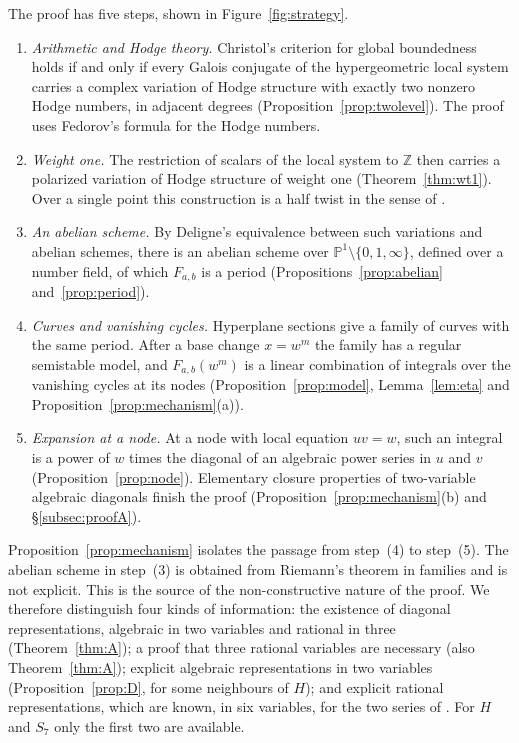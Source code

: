 \documentclass[11pt]{amsart}
\theoremstyle{definition}
\theoremstyle{remark}
\numberwithin{equation}{section}
\newcommand{\Z}{\mathbb{Z}}
\newcommand{\PP}{\mathbb{P}}
\newcommand{\Fab}{F_{a,b}}
\begin{document}
The proof has five steps, shown in Figure~\ref{fig:strategy}.
\begin{enumerate}[label=(\arabic*),leftmargin=2em]
\item \emph{Arithmetic and Hodge theory.} Christol's criterion for global boundedness holds if and only if every Galois conjugate of the hypergeometric local system carries a complex variation of Hodge structure with exactly two nonzero Hodge numbers, in adjacent degrees (Proposition~\ref{prop:twolevel}). The proof uses Fedorov's formula for the Hodge numbers.
\item \emph{Weight one.} The restriction of scalars of the local system to $\Z$ then carries a polarized variation of Hodge structure of weight one (Theorem~\ref{thm:wt1}). Over a single point this construction is a half twist in the sense of \citet{vanGeemen2001}.
\item \emph{An abelian scheme.} By Deligne's equivalence between such variations and abelian schemes, there is an abelian scheme over $\PP^1\setminus\{0,1,\infty\}$, defined over a number field, of which $\Fab$ is a period (Propositions~\ref{prop:abelian} and~\ref{prop:period}).
\item \emph{Curves and vanishing cycles.} Hyperplane sections give a family of curves with the same period. After a base change $x=w^m$ the family has a regular semistable model, and $\Fab(w^m)$ is a linear combination of integrals over the vanishing cycles at its nodes (Proposition~\ref{prop:model}, Lemma~\ref{lem:eta} and Proposition~\ref{prop:mechanism}(a)).
\item \emph{Expansion at a node.} At a node with local equation $uv=w$, such an integral is a power of $w$ times the diagonal of an algebraic power series in $u$ and $v$ (Proposition~\ref{prop:node}). Elementary closure properties of two-variable algebraic diagonals finish the proof (Proposition~\ref{prop:mechanism}(b) and \S\ref{subsec:proofA}).
\end{enumerate}
Proposition~\ref{prop:mechanism} isolates the passage from step~(4) to step~(5). The abelian scheme in step~(3) is obtained from Riemann's theorem in families and is not explicit. This is the source of the non-constructive nature of the proof. We therefore distinguish four kinds of information: the existence of diagonal representations, algebraic in two variables and rational in three (Theorem~\ref{thm:A}); a proof that three rational variables are necessary (also Theorem~\ref{thm:A}); explicit algebraic representations in two variables (Proposition~\ref{prop:D}, for some neighbours of $H$); and explicit rational representations, which are known, in six variables, for the two series of \citet{AbdelazizKoutschanMaillard2020}. For $H$ and $S_7$ only the first two are available.
\end{document}
